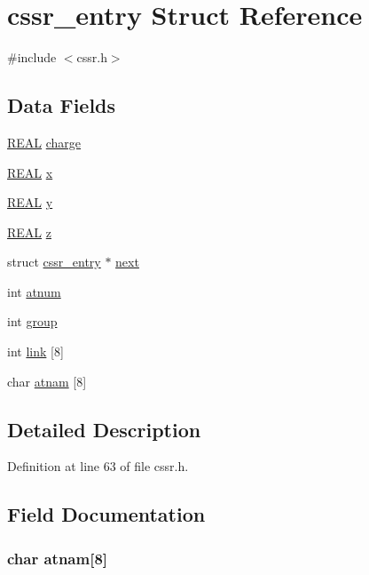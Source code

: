 \hypertarget{structcssr__entry}{\section{cssr\-\_\-entry Struct Reference}
\label{structcssr__entry}
}


{\ttfamily \#include $<$cssr.\-h$>$}

\subsection*{Data Fields}
\begin{DoxyCompactItemize}
\item 
\hyperlink{_math_type_8h_a5821460e95a0800cf9f24c38915cbbde}{R\-E\-A\-L} \hyperlink{structcssr__entry_afac660f5fc888ec4f05d43405a86779f}{charge}
\item 
\hyperlink{_math_type_8h_a5821460e95a0800cf9f24c38915cbbde}{R\-E\-A\-L} \hyperlink{structcssr__entry_ad14343030eb6dd7eb6a9c8b4c52fecb0}{x}
\item 
\hyperlink{_math_type_8h_a5821460e95a0800cf9f24c38915cbbde}{R\-E\-A\-L} \hyperlink{structcssr__entry_a1aa467ce26c2e3301d0b78836e30cab0}{y}
\item 
\hyperlink{_math_type_8h_a5821460e95a0800cf9f24c38915cbbde}{R\-E\-A\-L} \hyperlink{structcssr__entry_a9195b0e2ec564479b8a02cc3357410b7}{z}
\item 
struct \hyperlink{structcssr__entry}{cssr\-\_\-entry} $\ast$ \hyperlink{structcssr__entry_a1c51d4be3e96a81f4762fb2c3a4bacad}{next}
\item 
int \hyperlink{structcssr__entry_af0f05b6c256a3631c9735a45190bc2ae}{atnum}
\item 
int \hyperlink{structcssr__entry_a0242027ec3331f3d5793c42d21b6f4e1}{group}
\item 
int \hyperlink{structcssr__entry_a5867ebf64ca08d83b72b4da8dd68a0ee}{link} \mbox{[}8\mbox{]}
\item 
char \hyperlink{structcssr__entry_a0982e141e36a2d4299d6555e0a1496cb}{atnam} \mbox{[}8\mbox{]}
\end{DoxyCompactItemize}


\subsection{Detailed Description}


Definition at line 63 of file cssr.\-h.



\subsection{Field Documentation}
\hypertarget{structcssr__entry_a0982e141e36a2d4299d6555e0a1496cb}{
\subsubsection[{atnam}]{\setlength{\rightskip}{0pt plus 5cm}char atnam\mbox{[}8\mbox{]}}}\label{structcssr__entry_a0982e141e36a2d4299d6555e0a1496cb}


